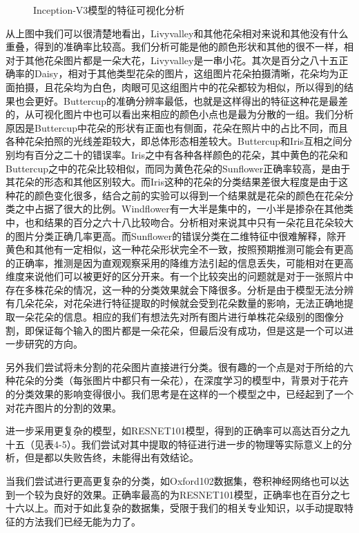 \documentclass[supercite]{HustGraduPaper}
\begin{document}
\begin{sloppypar}
\begin{figure}[H]
            \caption{Inception-V3模型的特征可视化分析}
            \end{figure}
        从上图中我们可以很清楚地看出，Livyvalley和其他花朵相对来说和其他没有什么重叠，得到的准确率比较高。我们分析可能是他的颜色形状和其他的很不一样，相对于其他花朵图片都是一朵大花，Livyvalley是一串小花。其次是百分之八十五正确率的Daisy，相对于其他类型花朵的图片，这组图片花朵拍摄清晰，花朵均为正面拍摄，且花朵均为白色，肉眼可见这组图片中的花朵都较为相似，所以得到的结果也会更好。Buttercup的准确分辨率最低，也就是这样得出的特征这种花是最差的，从可视化图片中也可以看出来相应的颜色小点也是最为分散的一组。我们分析原因是Buttercup中花朵的形状有正面也有侧面，花朵在照片中的占比不同，而且各种花朵拍照的光线差距较大，即总体形态相差较大。Buttercup和Iris互相之间分别均有百分之二十的错误率。Iris之中有各种各样颜色的花朵，其中黄色的花朵和Buttercup之中的花朵比较相似，而同为黄色花朵的Sunflower正确率较高，是由于其花朵的形态和其他区别较大。而Iris这种的花朵的分类结果差很大程度是由于这种花的颜色变化很多，结合之前的实验可以得到一个结果就是花朵的颜色在花朵分类之中占据了很大的比例。Windflower有一大半是集中的，一小半是掺杂在其他类中，也和结果的百分之六十八比较吻合。分析相对来说其中只有一朵花且花朵较大的图片分类正确几率更高。而Sunflower的错误分类在二维特征中很难解释，除开黄色和其他有一定相似，这一种花朵形状完全不一致，按照预期推测可能会有更高的正确率，推测是因为直观观察采用的降维方法引起的信息丢失，可能相对在更高维度来说他们可以被更好的区分开来。有一个比较突出的问题就是对于一张照片中存在多株花朵的情况，这一种的分类效果就会下降很多。分析是由于模型无法分辨有几朵花朵，对花朵进行特征提取的时候就会受到花朵数量的影响，无法正确地提取一朵花朵的信息。相应的我们有想法先对所有图片进行单株花朵级别的图像分割，即保证每个输入的图片都是一朵花朵，但最后没有成功，但是这是一个可以进一步研究的方向。

        另外我们尝试将未分割的花朵图片直接进行分类。很有趣的一个点是对于所给的六种花朵的分类（每张图片中都只有一朵花），在深度学习的模型中，背景对于花卉的分类效果的影响变得很小。我们思考是在这样的一个模型之中，已经起到了一个对花卉图片的分割的效果。

        进一步采用更复杂的模型，如RESNET101模型，得到的正确率可以高达百分之九十五（见表4-5）。我们尝试对其中提取的特征进行进一步的物理等实际意义上的分析，但是都以失败告终，未能得出有效结论。

        当我们尝试进行更高更复杂的分类，如Oxford102数据集，卷积神经网络也可以达到一个较为良好的效果。正确率最高的为RESNET101模型，正确率也在百分之七十六以上。而对于如此复杂的数据集，受限于我们的相关专业知识，以手动提取特征的方法我们已经无能为力了。

\end{sloppypar}
\end{document}
